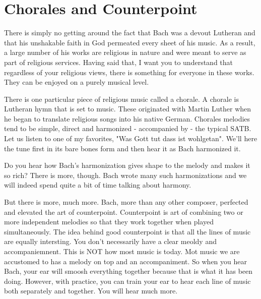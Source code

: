 \chapter{Chorales and Counterpoint}
There is simply no getting around the fact that Bach was a devout Lutheran and that his unshakable faith in God permeated every sheet of his music. As a result, a large number of his works are religious in nature and were meant to serve as part of religious services. Having said that, I want you to understand that regardless of your religious views, there is something for everyone in these works. They can be enjoyed on a purely musical level. 

There is one particular piece of religious music called a chorale. A chorale is Lutheran hymn that is set to music. These originated with Martin Luther when he began to translate religious songs into his native German. Chorales melodies tend to be simple, direct and harmonized - accompanied by - the typical SATB. Let us listen to one of my favorites, "Was Gott tut dass ist wohlgetan". We'll here the tune first in its bare bones form and then hear it as Bach harmonized it.


Do you hear how Bach's harmonization gives shape to the melody and makes it so rich? There is more, though. Bach wrote many such harmonizations and we will indeed spend quite a bit of time talking about harmony. 

But there is more, much more. Bach, more than any other composer, perfected and elevated the art of counterpoint. %
Counterpoint is art of combining two or more independent melodies so that they work together when played simultaneously. The idea behind good counterpoint is that all the lines of music are equally intersting. You don't necessarily have a clear meoldy and accompaniemnent. This is NOT how most music is today. Mot music we are accustomed to has a melody on top and an accompaniment. %
So when you hear Bach, your ear will smoosh everything together because that is what it has been doing. However, with practice, you can train your ear to hear each line of music both separately and together. You will hear much more. 